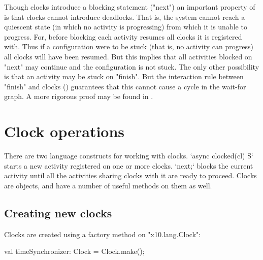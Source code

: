 
Though clocks introduce a blocking statement (\xcd"next") an important
property of \Xten{} is that clocks cannot introduce deadlocks. That
is, the system cannot reach a quiescent state (in which no activity is
progressing) from which it is unable to progress. For, before blocking
each activity resumes all clocks it is registered with. Thus if a
configuration were to be stuck (that is, no activity can progress) all
clocks will have been resumed. But this implies that all activities
blocked on \xcd"next" may continue and the configuration is not stuck.
The only other possibility is that an activity may be stuck on
\xcd"finish". But the interaction rule between \xcd"finish" and clocks
() guarantees that this cannot cause a cycle
in the wait-for graph. A more rigorous proof may be found in \cite{X10-concur05}.

\section{Clock operations}\label{sec:clock}
There are two language constructs for working with clocks. 
\xcd`async clocked(cl) S` starts a new activity registered on one or more
clocks.  \xcd`next;` blocks the current activity until all the activities
sharing clocks with it are ready to proceed. 
Clocks are objects, and have a number of useful methods on them as well.

\subsection{Creating new clocks}\label{sec:clock:create}

Clocks are created using a factory method on \xcd"x10.lang.Clock":


\begin{xten}
val timeSynchronizer: Clock = Clock.make();
\end{xten}


